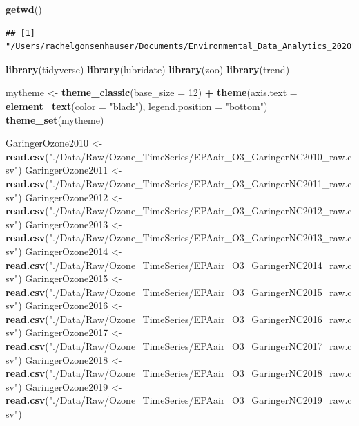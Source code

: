 \documentclass[]{article}
\newenvironment{Shaded}{\begin{snugshade}}{\end{snugshade}}
\newcommand{\DataTypeTok}[1]{\textcolor[rgb]{0.13,0.29,0.53}{#1}}
\newcommand{\DecValTok}[1]{\textcolor[rgb]{0.00,0.00,0.81}{#1}}
\newcommand{\KeywordTok}[1]{\textcolor[rgb]{0.13,0.29,0.53}{\textbf{#1}}}
\newcommand{\NormalTok}[1]{#1}
\newcommand{\OperatorTok}[1]{\textcolor[rgb]{0.81,0.36,0.00}{\textbf{#1}}}
\newcommand{\StringTok}[1]{\textcolor[rgb]{0.31,0.60,0.02}{#1}}
\begin{document}
\begin{Shaded}
\begin{Highlighting}[]
\KeywordTok{getwd}\NormalTok{()}
\end{Highlighting}
\end{Shaded}

\begin{verbatim}
## [1] "/Users/rachelgonsenhauser/Documents/Environmental_Data_Analytics_2020"
\end{verbatim}

\begin{Shaded}
\begin{Highlighting}[]
\KeywordTok{library}\NormalTok{(tidyverse)}
\KeywordTok{library}\NormalTok{(lubridate)}
\KeywordTok{library}\NormalTok{(zoo)}
\KeywordTok{library}\NormalTok{(trend)}

\NormalTok{mytheme <-}\StringTok{ }\KeywordTok{theme_classic}\NormalTok{(}\DataTypeTok{base_size =} \DecValTok{12}\NormalTok{) }\OperatorTok{+}
\StringTok{  }\KeywordTok{theme}\NormalTok{(}\DataTypeTok{axis.text =} \KeywordTok{element_text}\NormalTok{(}\DataTypeTok{color =} \StringTok{"black"}\NormalTok{),}
        \DataTypeTok{legend.position =} \StringTok{"bottom"}\NormalTok{)}
\KeywordTok{theme_set}\NormalTok{(mytheme)}

\NormalTok{GaringerOzone2010 <-}\StringTok{ }\KeywordTok{read.csv}\NormalTok{(}\StringTok{"./Data/Raw/Ozone_TimeSeries/EPAair_O3_GaringerNC2010_raw.csv"}\NormalTok{)}
\NormalTok{GaringerOzone2011 <-}\StringTok{ }\KeywordTok{read.csv}\NormalTok{(}\StringTok{"./Data/Raw/Ozone_TimeSeries/EPAair_O3_GaringerNC2011_raw.csv"}\NormalTok{)}
\NormalTok{GaringerOzone2012 <-}\StringTok{ }\KeywordTok{read.csv}\NormalTok{(}\StringTok{"./Data/Raw/Ozone_TimeSeries/EPAair_O3_GaringerNC2012_raw.csv"}\NormalTok{)}
\NormalTok{GaringerOzone2013 <-}\StringTok{ }\KeywordTok{read.csv}\NormalTok{(}\StringTok{"./Data/Raw/Ozone_TimeSeries/EPAair_O3_GaringerNC2013_raw.csv"}\NormalTok{)}
\NormalTok{GaringerOzone2014 <-}\StringTok{ }\KeywordTok{read.csv}\NormalTok{(}\StringTok{"./Data/Raw/Ozone_TimeSeries/EPAair_O3_GaringerNC2014_raw.csv"}\NormalTok{)}
\NormalTok{GaringerOzone2015 <-}\StringTok{ }\KeywordTok{read.csv}\NormalTok{(}\StringTok{"./Data/Raw/Ozone_TimeSeries/EPAair_O3_GaringerNC2015_raw.csv"}\NormalTok{)}
\NormalTok{GaringerOzone2016 <-}\StringTok{ }\KeywordTok{read.csv}\NormalTok{(}\StringTok{"./Data/Raw/Ozone_TimeSeries/EPAair_O3_GaringerNC2016_raw.csv"}\NormalTok{)}
\NormalTok{GaringerOzone2017 <-}\StringTok{ }\KeywordTok{read.csv}\NormalTok{(}\StringTok{"./Data/Raw/Ozone_TimeSeries/EPAair_O3_GaringerNC2017_raw.csv"}\NormalTok{)}
\NormalTok{GaringerOzone2018 <-}\StringTok{ }\KeywordTok{read.csv}\NormalTok{(}\StringTok{"./Data/Raw/Ozone_TimeSeries/EPAair_O3_GaringerNC2018_raw.csv"}\NormalTok{)}
\NormalTok{GaringerOzone2019 <-}\StringTok{ }\KeywordTok{read.csv}\NormalTok{(}\StringTok{"./Data/Raw/Ozone_TimeSeries/EPAair_O3_GaringerNC2019_raw.csv"}\NormalTok{)}
\end{Highlighting}
\end{Shaded}
\end{document}
